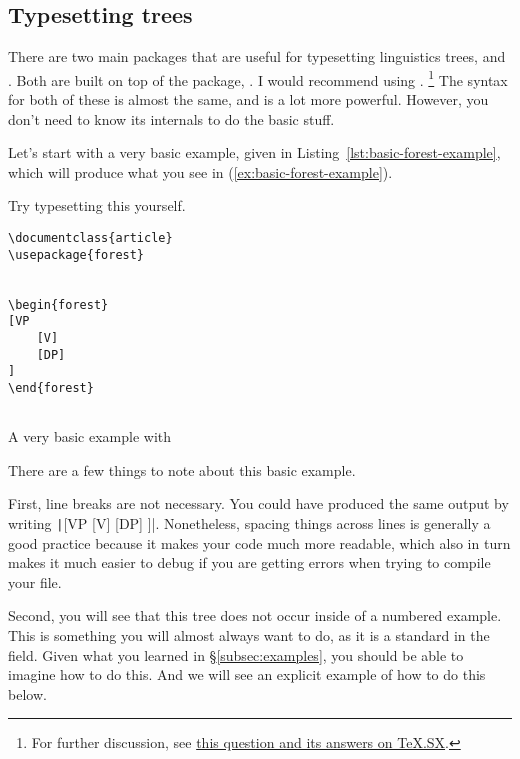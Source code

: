 \subsection{Typesetting trees}
\label{subsec:typesetting-trees}

There are two main packages that are useful for typesetting linguistics trees,  and .
Both are built on top of the package, .
I would recommend using .%
\footnote{%
For further discussion, see \href{http://tex.stackexchange.com/q/5447/32888}{this question and its answers on TeX.SX}.%
}
The syntax for both of these is almost the same, and  is a lot more powerful.
However, you don't need to know its internals to do the basic stuff.

Let's start with a very basic example, given in Listing~\ref{lst:basic-forest-example}, which will produce what you see in (\ref{ex:basic-forest-example}).

Try typesetting this yourself.

\begin{exe}
	\ex[]{
		\begin{forest}
		[VP
			[V]
			[DP]
		]
		\end{forest}
	}
	\label{ex:basic-forest-example}
\end{exe}

\begin{listing}[htbp]
	\centering
	\begin{verbatim}
\documentclass{article}
\usepackage{forest}


\begin{forest}
[VP
    [V]
    [DP]
]
\end{forest}


	\end{verbatim}
	\caption{A very basic example with }
	\label{lst:basic-forest-example}
\end{listing}

There are a few things to note about this basic example.

First, line breaks are not necessary.
You could have produced the same output by writing \texttt|[VP [V] [DP] ]|.
Nonetheless, spacing things across lines is generally a good practice because it makes your code much more readable, which also in turn makes it much easier to debug if you are getting errors when trying to compile your file.

Second, you will see that this tree does not occur inside of a numbered example.
This is something you will almost always want to do, as it is a standard in the field.
Given what you learned in \S\ref{subsec:examples}, you should be able to imagine how to do this.
And we will see an explicit example of how to do this below.

